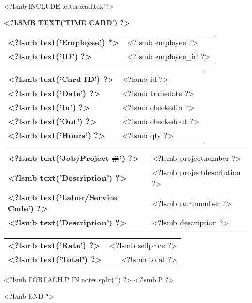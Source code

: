 \documentclass{scrartcl}
\begin{document}
\pagestyle{myheadings}
\thispagestyle{empty}

<?lsmb INCLUDE letterhead.tex ?>

\centerline{\textbf{\MakeUppercase{<?lsmb text('Time Card') ?>}}}

\vspace*{0.5cm}

\begin{tabular}[t]{ll}
  \textbf{<?lsmb text('Employee') ?>} & <?lsmb employee ?> \\
  \textbf{<?lsmb text('ID') ?>} & <?lsmb employee_id ?> \\
\end{tabular}
\hfill
\begin{tabular}[t]{ll}
  \textbf{<?lsmb text('Card ID') ?>} & <?lsmb id ?> \\
  \textbf{<?lsmb text('Date') ?>} & <?lsmb transdate ?> \\
  \textbf{<?lsmb text('In') ?>} & <?lsmb checkedin ?> \\
  \textbf{<?lsmb text('Out') ?>} & <?lsmb checkedout ?> \\
  \textbf{<?lsmb text('Hours') ?>} & <?lsmb qty ?> \\
\end{tabular}

\vspace{1cm}

\begin{tabular}[b]{ll}
  \textbf{<?lsmb text('Job/Project #') ?>} & <?lsmb projectnumber ?> \\
  \textbf{<?lsmb text('Description') ?>} & <?lsmb projectdescription ?> \\
  \textbf{<?lsmb text('Labor/Service Code') ?>} & <?lsmb partnumber ?> \\
  \textbf{<?lsmb text('Description') ?>} & <?lsmb description ?> \\
\end{tabular}
\hfill
\begin{tabular}[b]{lr}
  \textbf{<?lsmb text('Rate') ?>} & <?lsmb sellprice ?> \\
  \textbf{<?lsmb text('Total') ?>} & <?lsmb total ?> \\
\end{tabular}
  
\vspace{0.3cm}

<?lsmb FOREACH P IN notes.split('\n\n') ?>
<?lsmb P ?>\medskip

<?lsmb END ?>
 
\end{document}
